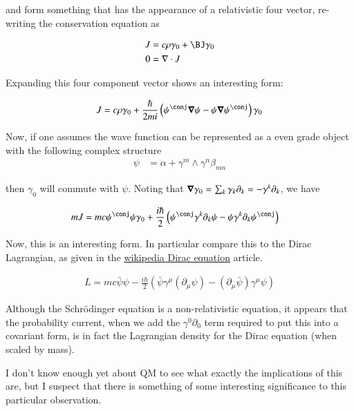 and form something that has the appearance of a relativistic four vector, re-writing the conservation equation as

\begin{align*}
J &= c\rho \gamma_0 + \BJ \gamma_0 \\
0 &= \grad \cdot J
\end{align*}

Expanding this four component vector shows an interesting form:

\begin{align*}
J &= c \rho \gamma_0 + 
\frac{\hbar}{2mi} \left( \psi^\conj \spacegrad \psi - \psi \spacegrad \psi^\conj \right) \gamma_0 \\
\end{align*}

Now, if one assumes the wave function can be represented as a even grade object with the following complex
structure
\begin{align*}
\psi &= \alpha + \gamma^m \wedge \gamma^n \beta_{mn}
\end{align*}

then $\gamma_0$ will commute with $\psi$.  Noting that $\boldsymbol{\nabla} \gamma_0 = \sum_k \gamma_k \partial_k = -\gamma^k \partial_k$, we have

\begin{align*}
m J &= m c \psi^\conj \psi \gamma_0 + 
\frac{i\hbar}{2} \left( \psi^\conj \gamma^k \partial_k \psi - \psi \gamma^k \partial_k \psi^\conj \right) 
\end{align*}

Now, this is an interesting form.  In particular compare this to the Dirac Lagrangian, as given in 
the \href{http://en.wikipedia.org/wiki/Dirac_equation#Adjoint_equation_and_Dirac_current}{wikipedia Dirac equation} article.

\begin{align*}
L = mc \bar{\psi}\psi - \frac{i\hbar}{2}(\bar{\psi}\gamma^\mu (\partial_\mu\psi) - (\partial_\mu\bar{\psi})\gamma^\mu \psi)
\end{align*}

Although the Schr\"{o}dinger equation is a non-relativistic equation, it appears that the probability current, 
when we add the $\gamma^0 \partial_0$ term required to put this into a covariant form, is in fact the Lagrangian density
for the Dirac equation (when scaled by mass).

I don't know enough yet about QM to see what exactly the implications of this are, but I suspect that there is something
of some interesting significance to this particular observation.

